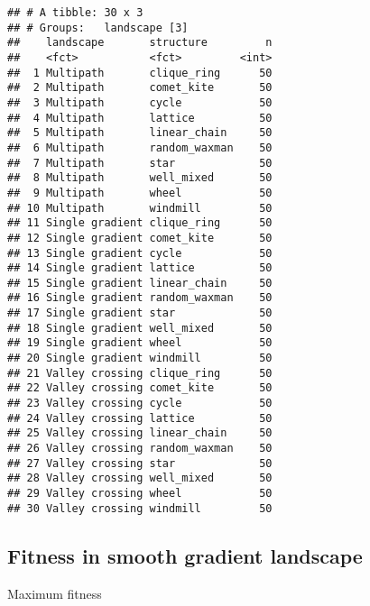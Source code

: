 \documentclass[
]{book}
\begin{document}
\begin{verbatim}
## # A tibble: 30 x 3
## # Groups:   landscape [3]
##    landscape       structure         n
##    <fct>           <fct>         <int>
##  1 Multipath       clique_ring      50
##  2 Multipath       comet_kite       50
##  3 Multipath       cycle            50
##  4 Multipath       lattice          50
##  5 Multipath       linear_chain     50
##  6 Multipath       random_waxman    50
##  7 Multipath       star             50
##  8 Multipath       well_mixed       50
##  9 Multipath       wheel            50
## 10 Multipath       windmill         50
## 11 Single gradient clique_ring      50
## 12 Single gradient comet_kite       50
## 13 Single gradient cycle            50
## 14 Single gradient lattice          50
## 15 Single gradient linear_chain     50
## 16 Single gradient random_waxman    50
## 17 Single gradient star             50
## 18 Single gradient well_mixed       50
## 19 Single gradient wheel            50
## 20 Single gradient windmill         50
## 21 Valley crossing clique_ring      50
## 22 Valley crossing comet_kite       50
## 23 Valley crossing cycle            50
## 24 Valley crossing lattice          50
## 25 Valley crossing linear_chain     50
## 26 Valley crossing random_waxman    50
## 27 Valley crossing star             50
## 28 Valley crossing well_mixed       50
## 29 Valley crossing wheel            50
## 30 Valley crossing windmill         50
\end{verbatim}

\hypertarget{fitness-in-smooth-gradient-landscape}{%
\subsection{Fitness in smooth gradient landscape}\label{fitness-in-smooth-gradient-landscape}}

Maximum fitness
\end{document}
